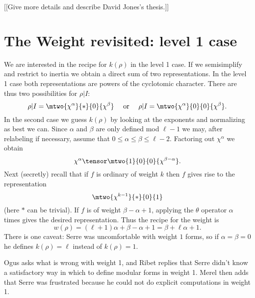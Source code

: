 \documentclass{report}
\begin{document}
[[Give more details and describe David Jones's thesis.]]

\section{The Weight revisited: level 1 case}
We are interested in the recipe for $k(\rho)$ in
the level 1 case.  If we semisimplify and restrict to inertia we obtain
a direct sum of two representations.  In the level 1 case
both representations are powers of the cyclotomic character.
There are thus two possibilities for $\rho|I$:
$$\rho|I=\mtwo{\chi^{\alpha}}{*}{0}{\chi^{\beta}}
\quad \text{ or }\quad
\rho|I=\mtwo{\chi^{\alpha}}{0}{0}{\chi^{\beta}}.$$
In the second case we guess $k(\rho)$ by
looking at the exponents and normalizing
as best we can.  Since $\alpha$
and $\beta$ are only defined mod $\ell-1$ we may, after relabeling if
necessary, assume that
$0\leq\alpha\leq\beta\leq \ell-2$.
Factoring out $\chi^{\alpha}$ we obtain
$$\chi^{\alpha}\tensor\mtwo{1}{0}{0}{\chi^{\beta-\alpha}}.$$
Next (secretly) recall that if $f$ is ordinary of weight $k$ then
$f$ gives rise to the representation
$$\mtwo{\chi^{k-1}}{*}{0}{1}$$
(here $*$ can be trivial).
If $f$ is of weight $\beta-\alpha+1$, applying the $\theta$ operator
$\alpha$ times gives the desired representation.
Thus the recipe for the weight is
$$w(\rho) = (\ell+1)\alpha+\beta-\alpha+1=\beta+\ell \alpha+1.$$
There is one caveat: Serre was uncomfortable
with weight $1$ forms, so if
$\alpha=\beta=0$ he defines $k(\rho)=\ell$
instead of $k(\rho)=1$.

Ogus asks what is wrong with weight 1, and Ribet
replies that Serre didn't know a satisfactory way in which to
define modular forms in weight 1.  Merel then adds
that Serre was frustrated because he could not do explicit
computations in weight 1.
\end{document}
